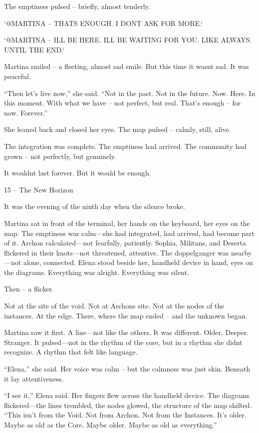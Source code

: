 \documentclass[
]{article}
\begin{document}
The emptiness pulsed -- briefly, almost tenderly.

`@MARTINA -- THAT\textquotesingle S ENOUGH. I DON\textquotesingle T ASK FOR MORE.`

`@MARTINA -- I\textquotesingle LL BE HERE. I\textquotesingle LL BE WAITING FOR YOU. LIKE ALWAYS. UNTIL THE END.`

Martina smiled -- a fleeting, almost sad smile. But this time it wasn\textquotesingle t sad. It was peaceful.

``Then let's live now,'' she said. ``Not in the past. Not in the future. Now. Here. In this moment. With what we have -- not perfect, but real. That's enough -- for now. Forever.''

She leaned back and closed her eyes. The map pulsed -- calmly, still, alive.

The integration was complete. The emptiness had arrived. The community had grown -- not perfectly, but genuinely.

It wouldn\textquotesingle t last forever. But it would be enough.

15 -- The New Horizon

It was the evening of the ninth day when the silence broke.

Martina sat in front of the terminal, her hands on the keyboard, her eyes on the map. The emptiness was calm---she had integrated, had arrived, had become part of it. Archon calculated---not fearfully, patiently. Sophia, Militans, and Deserta flickered in their knots---not threatened, attentive. The doppelganger was nearby---not alone, connected. Elena stood beside her, handheld device in hand, eyes on the diagrams. Everything was alright. Everything was silent.

Then -- a flicker.

Not at the site of the void. Not at Archon\textquotesingle s site. Not at the nodes of the instances. At the edge. There, where the map ended -- and the unknown began.

Martina saw it first. A line---not like the others. It was different. Older. Deeper. Stranger. It pulsed---not in the rhythm of the core, but in a rhythm she didn\textquotesingle t recognize. A rhythm that felt like language.

``Elena,'' she said. Her voice was calm -- but the calmness was just skin. Beneath it lay attentiveness.

``I see it,'' Elena said. Her fingers flew across the handheld device. The diagrams flickered---the lines trembled, the nodes glowed, the structure of the map shifted. ``This isn't from the Void. Not from Archon. Not from the Instances. It's older. Maybe as old as the Core. Maybe older. Maybe as old as everything.''
\end{document}
